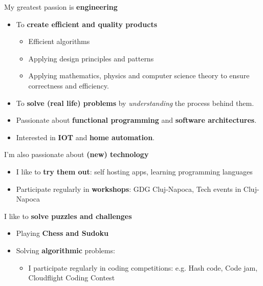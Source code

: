 
My greatest passion is \textbf{engineering} 

\begin{itemize}
\item To \textbf{create efficient and quality products}

\begin{itemize}
\item Efficient algorithms


\item Applying design principles and patterns

\item Applying mathematics, physics and computer science theory to ensure correctness and efficiency.

\end{itemize}
 
\item To \textbf{solve (real life) problems} by \textit{understanding} the process behind them.


\item Passionate about \textbf{functional programming} and \textbf{software architectures}.

\item Interested in \textbf{IOT} and \textbf{home automation}.

\end{itemize}

\divider

I'm also passionate about \textbf{(new) technology}

\begin{itemize}
 \item I like to \textbf{try them out}: self hosting apps, learning programming languages
 \item Participate regularly in \textbf{workshops}: GDG Cluj-Napoca, Tech events in Cluj-Napoca
\end{itemize} 

\divider

I like to \textbf{solve puzzles and challenges}
\begin{itemize}
 \item Playing \textbf{Chess and Sudoku}
 \item Solving \textbf{algorithmic} problems:
 \begin{itemize}
  \item I participate regularly in coding competitions: e.g. Hash code, Code jam, Cloudflight Coding Contest
 \end{itemize}

\end{itemize} 

